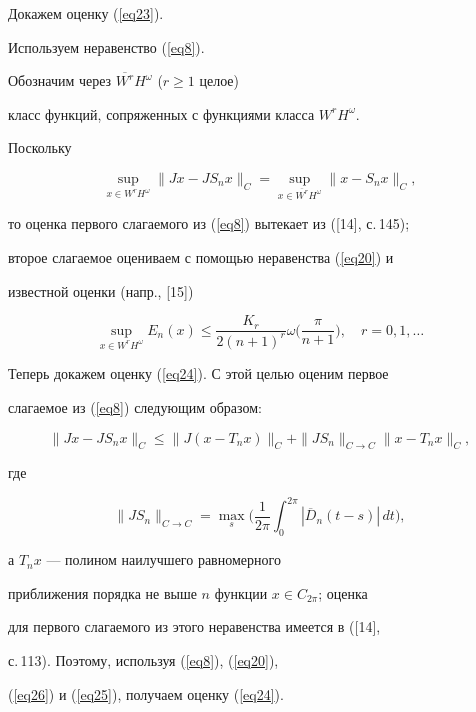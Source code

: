 \begin{pf}


Докажем оценку (\ref{eq23}).


Используем неравенство (\ref{eq8}).


Обозначим через $\overline{W^r}H^{\omega}$ ($r\geq1$ целое)


класс функций, сопряженных с функциями класса $W^rH^\omega$.


Поскольку


$$


\sup_{x\in


W^rH^\omega}\|Jx-JS_nx\|_C =


\sup_{x\in\overline{W^r}H^\omega}\|x-S_nx\|_C,


$$


то оценка первого слагаемого из (\ref{eq8}) вытекает из ([14], с.\,145);


второе слагаемое оцениваем с помощью неравенства (\ref{eq20}) и


известной оценки (напр., [15])


\begin{equation}\label{eq25}


\sup_{x\in W^rH^\omega}E_n(x)\leq


\frac{K_r}{2(n+1)^r}\omega\bigg(\frac{\pi}{n+1}\bigg),\quad


r=0,1,\dotsc


\end{equation}





Теперь докажем оценку (\ref{eq24}). С этой целью оценим первое


слагаемое из (\ref{eq8}) следующим образом:


\begin{equation}\label{eq26}


\|Jx-JS_nx\|_C\leq


\|J(x-T_nx)\|_C +


\|JS_n\|_{C\to C}\|x-T_nx\|_C,


\end{equation}


где


$$


\|JS_n\|_{C\to


C}= \max_s\bigg(\frac{1}{2\pi}


\int_0^{2\pi}|\overline{D}_n(t-s)|\,


dt \bigg),


$$


а $T_nx$ --- полином наилучшего равномерного


приближения порядка не выше $n$ функции $x\in C_{2\pi}$; оценка


для первого слагаемого из этого неравенства имеется в ([14],


с.\,113). Поэтому, используя (\ref{eq8}), (\ref{eq20}),


(\ref{eq26}) и (\ref{eq25}), получаем оценку (\ref{eq24}).


\end{pf}








